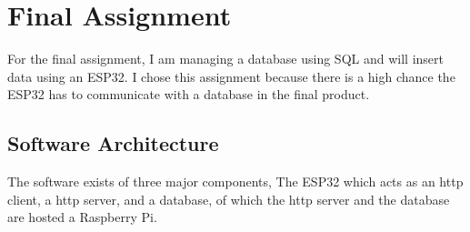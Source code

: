 \section{Final Assignment}
For the final assignment, I am managing a database using SQL and will insert data using an ESP32.
I chose this assignment because there is a high chance the ESP32 has to communicate with a database in the final product.

\subsection{Software Architecture}
The software exists of three major components, The ESP32 which acts as an \gls{http} client, a \gls{http} server, and a database, of which the \gls{http} server and the database are hosted a Raspberry Pi.

\clearpage

